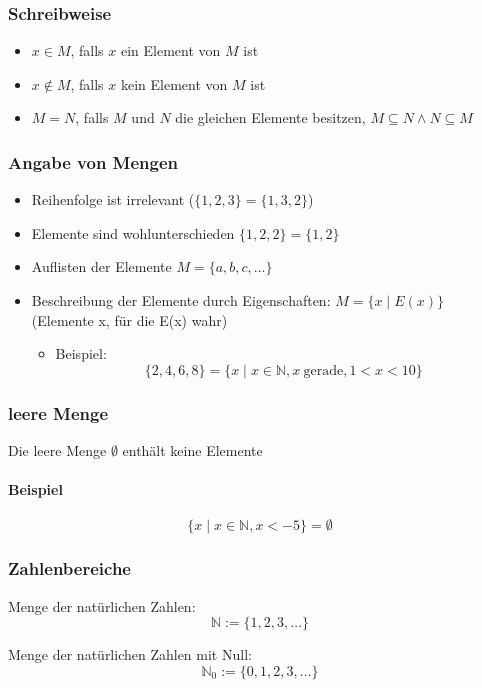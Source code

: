 \documentclass[a4paper]{scrartcl}
\theoremstyle{definition}
\theoremstyle{plain}
\theoremstyle{plain}
\theoremstyle{remark}
\theoremstyle{remark}
\theoremstyle{remark}
\theoremstyle{remark}
\theoremstyle{remark}
\begin{document}
\subsubsection{Schreibweise}
\label{sec-2-4-1}
\begin{itemize}
\item $x\in M$, falls $x$ ein Element von $M$ ist
\item $x\not\in M$, falls $x$ kein Element von $M$ ist
\item $M=N$, falls $M$ und $N$ die gleichen Elemente besitzen, $M\subseteq N \wedge N\subseteq M$
\end{itemize}

\subsubsection{Angabe von Mengen}
\label{sec-2-4-2}
\begin{itemize}
\item Reihenfolge ist irrelevant ($\{1,2,3\}=\{1,3,2\}$)
\item Elemente sind wohlunterschieden $\{1,2,2\} = \{1,2\}$
\item Auflisten der Elemente $M=\{a,b,c,\ldots\}$
\item Beschreibung der Elemente durch Eigenschaften: $M=\{x\mid E(x)\}$ \\
     (Elemente x, für die E(x) wahr)
\begin{itemize}
\item Beispiel:
\[\{2,4,6,8\} = \{x\mid x\in\mathbb{N}, x~\text{gerade}, 1 < x < 10\}\]
\end{itemize}
\end{itemize}
\subsubsection{leere Menge}
\label{sec-2-4-3}
Die leere Menge $\emptyset$ enthält keine Elemente
\paragraph{Beispiel}
\label{sec-2-4-3-1}
\[\{x\mid x\in\mathbb{N}, x < -5\} = \emptyset\]

\subsubsection{Zahlenbereiche}
\label{sec-2-4-4}
Menge der natürlichen Zahlen:
\[\mathbb{N} := \{1,2,3,\ldots\}\]

Menge der natürlichen Zahlen mit Null:
\[\mathbb{N}_0 := \{0, 1,2,3,\ldots\}\]
\end{document}
